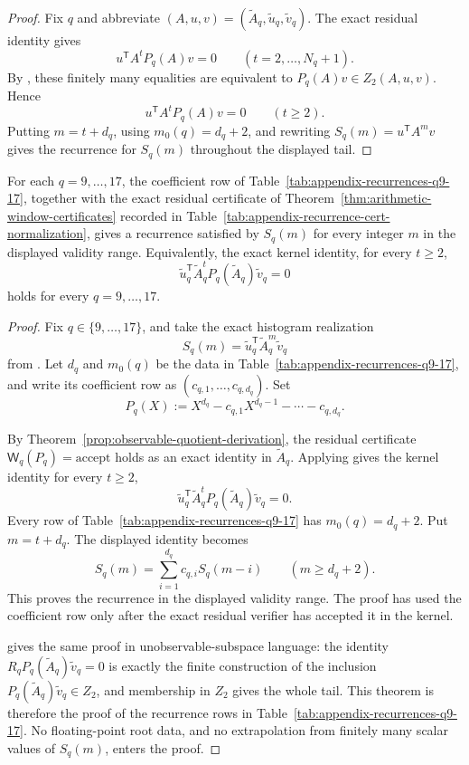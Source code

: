 \begin{proof}
Fix \(q\) and abbreviate
\((A,u,v)=(\widetilde A_q,\widetilde u_q,\widetilde v_q)\).  The exact
residual identity gives
\[
  u^{\mathsf T}A^tP_q(A)v=0\qquad(t=2,\dots,N_q+1).
\]
By , these finitely many
equalities are equivalent to \(P_q(A)v\in Z_2(A,u,v)\).  Hence
\[
  u^{\mathsf T}A^tP_q(A)v=0\qquad(t\ge2).
\]
Putting \(m=t+d_q\), using \(m_0(q)=d_q+2\), and rewriting
\(S_q(m)=u^{\mathsf T}A^mv\) gives the recurrence for \(S_q(m)\) throughout
the displayed tail.
\end{proof}

\begin{theorem}
\label{prop:kernel-derived-recurrences}
For each \(q=9,\dots,17\), the coefficient row of
Table~\ref{tab:appendix-recurrences-q9-17}, together with the exact residual
certificate of Theorem~\ref{thm:arithmetic-window-certificates} recorded in
Table~\ref{tab:appendix-recurrence-cert-normalization}, gives a
recurrence satisfied by \(S_q(m)\) for every integer \(m\) in the displayed
validity range.  Equivalently,
the exact kernel identity, for every \(t\ge2\),
\[
  \widetilde u_q^{\mathsf T}\widetilde A_q^t
  P_q(\widetilde A_q)\widetilde v_q=0
\]
holds for every \(q=9,\dots,17\).
\end{theorem}

\begin{proof}
Fix \(q\in\{9,\dots,17\}\), and take the exact histogram realization
\[
  S_q(m)=\widetilde u_q^{\mathsf T}\widetilde A_q^m\widetilde v_q
\]
from .  Let \(d_q\) and \(m_0(q)\) be
the data in Table~\ref{tab:appendix-recurrences-q9-17}, and write its
coefficient row as \((c_{q,1},\dots,c_{q,d_q})\).  Set
\[
  P_q(X):=
  X^{d_q}
  -c_{q,1}X^{d_q-1}
  -\cdots
  -c_{q,d_q}.
\]

By Theorem~\ref{prop:observable-quotient-derivation}, the residual certificate
\(\mathsf W_q(P_q)=\mathrm{accept}\) holds as an exact identity in
\(\widetilde A_q\).  Applying
 gives the kernel identity for
every \(t\ge2\),
\[
  \widetilde u_q^{\mathsf T}\widetilde A_q^t
  P_q(\widetilde A_q)\widetilde v_q=0.
\]
Every row of Table~\ref{tab:appendix-recurrences-q9-17} has
\(m_0(q)=d_q+2\).  Put \(m=t+d_q\).  The displayed identity becomes
\[
  S_q(m)=\sum_{i=1}^{d_q}c_{q,i}S_q(m-i)
  \qquad(m\ge d_q+2).
\]
This proves the recurrence in the displayed validity range.  The proof has used
the coefficient row only after the exact residual verifier has accepted it in the
kernel.

 gives the same proof in
unobservable-subspace language: the identity
\(R_qP_q(\widetilde A_q)\widetilde v_q=0\) is exactly the finite construction
of the inclusion
\(P_q(\widetilde A_q)\widetilde v_q\in Z_2\), and membership in \(Z_2\) gives
the whole tail.  This theorem is therefore the proof of the recurrence rows in
Table~\ref{tab:appendix-recurrences-q9-17}.  No floating-point root data, and no
extrapolation from finitely many scalar values of \(S_q(m)\), enters the proof.
\end{proof}

